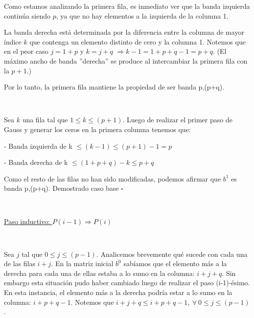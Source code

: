 Como estamos analizando la primera fila, es inmediato ver que la banda izquierda continúa siendo $p$, ya que no hay elementos
a la izquierda de la columna 1.

La banda derecha está determinada por la diferencia entre la columna de mayor índice $k$ que contenga un elemento distinto
de cero y la columna 1. Notemos que en el peor caso $j=1+p$ y $k=j+q$ $\Rightarrow k-1 = 1+p+q-1 = p+q$. (El máximo ancho de 
banda ''derecha'' se produce al intercambiar la primera fila con la $p+1$.)

Por lo tanto, la primera fila mantiene la propiedad de ser banda p,(p+q).

~

Sea $k$ una fila tal que $1 \leq k \leq (p+1)$. Luego de realizar el primer paso de Gauss y generar los ceros en la 
primera columna tenemos que:

- Banda izquierda de k $\leq (k-1) \leq (p+1)-1 = p$

- Banda derecha de k $ \leq (1+p+q)-k \leq p+q $

Como el resto de las filas no han sido modificadas, podemos afirmar que $b^{1}$ es banda p,(p+q). 
Demostrado caso base $\square$

~

\underline{Paso inductivo: $P(i-1) \Rightarrow P(i)$}

~

Sea $j$ tal que $0 \leq j \leq (p-1)$. Analicemos brevemente qué sucede con cada una de las filas $i+j$.
En la matriz inicial $b^{0}$ sabíamos que el elemento más a la derecha para cada una de ellas estaba a lo sumo en la columna:
$i+j+q$. Sin embargo esta situación pudo haber cambiado luego de realizar el paso (i-1)-ésimo. En esta instancia, el
elemento más a la derecha podría estar a lo sumo en la columna: $i+p+q-1$. Notemos que $i+j+q \leq i+p+q-1 , \ \forall 
\ 0 \leq j \leq (p-1)$.

